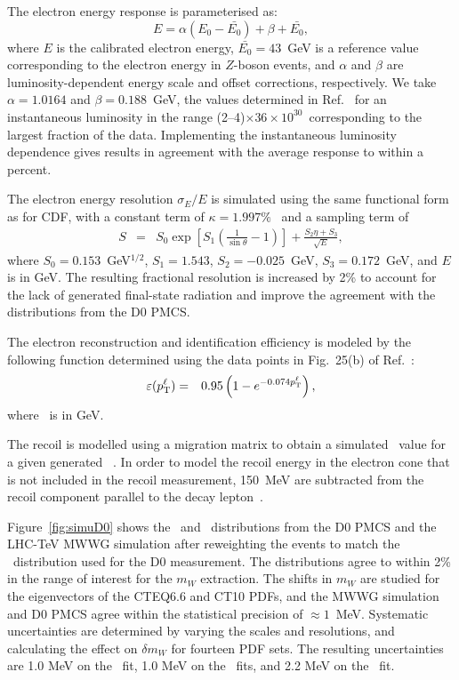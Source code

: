 The electron energy response is parameterised as:
\begin{equation}
E = \alpha(E_0-\bar{E_0}) + \beta + \bar{E_0},
\end{equation}
where $E$ is the calibrated electron energy, $\bar{E_0}=43$~GeV is a reference value corresponding to the electron energy 
in $Z$-boson events, and $\alpha$ and $\beta$ are luminosity-dependent energy scale and offset corrections, respectively.  
We take $\alpha=1.0164$ and $\beta=0.188$~GeV, the values determined in Ref.~\cite{D0:2013jba} for an instantaneous 
luminosity in the range (2--4)$\times 36\times 10^{30}$\instlum~corresponding to the largest fraction of the 
data.  Implementing the instantaneous luminosity dependence gives results in agreement with the average response to 
within a percent.

The electron energy resolution $\sigma_E/E$ is simulated using the same functional form as for CDF, with a constant term
of $\kappa=1.997\%$~\cite{D0:2013jba} and a sampling term of
\begin{eqnarray}
  S &=& S_0 \exp\left[S_1\left( \frac {1}{\sin\theta}-1\right)\right] + \frac{S_2\eta+S_3}{\sqrt{E}},
 \end{eqnarray}
where $S_0=0.153$~GeV$^{1/2}$, $S_1=1.543$, $S_2=-0.025$~GeV, $S_3=0.172$~GeV, and $E$ is in GeV. The resulting fractional
resolution is increased by 2\% to account for the lack of generated final-state radiation and improve the agreement with the
distributions from the D0 PMCS.

The electron reconstruction and identification efficiency is modeled by the following function
determined using the data points in Fig.~25(b) of Ref.~\cite{D0:2013jba}:
\begin{eqnarray}
\varepsilon( p_{\scriptsize\textrm{T}}^{\ell})&=& 0.95 \left(1- e^{-{0.074  p_{\scriptsize\textrm{T}}^{\ell}}}\right),
\end{eqnarray}
where \pTl~is in GeV.

The recoil is modelled using a migration matrix to obtain a simulated \uT~value for a given generated
\pTW~\cite{D0:2020ujb}.  In order to model the recoil energy in the electron cone that is not included
in the recoil measurement, 150~MeV are subtracted from the recoil component parallel to the decay
lepton~\cite{D0:2013jba}.

Figure~\ref{fig:simuD0} shows the \pTl~and \mT~distributions from the D0 PMCS and the LHC-TeV MWWG 
simulation after reweighting the events to match the \pTW~distribution used for the D0 measurement.  The distributions
agree to within 2\% in the range of interest for the $m_W$ extraction.  The shifts in $m_W$ are studied for the 
eigenvectors of the CTEQ6.6 and CT10 PDFs, and the MWWG simulation and D0 PMCS agree within the statistical 
precision of $\approx 1$~MeV.  Systematic uncertainties are determined by varying the scales and resolutions, and 
calculating the effect on $\delta m_W$ for fourteen PDF sets.  The resulting uncertainties are 1.0 MeV on the \mT~fit, 
1.0 MeV on the \pTl~fits, and 2.2 MeV on the \met~fit.

